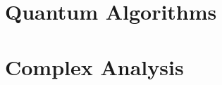 \documentclass{book}
\newcommand{\parttoc}{}
\theoremstyle{definition}
\theoremstyle{definition}
\numberwithin{asy}{chapter}
\begin{document}


\part{Quantum Algorithms}
\label{part:quantum}
\parttoc




% 

\part{Complex Analysis}
\label{part:cmplxana}
\parttoc






\end{document}
